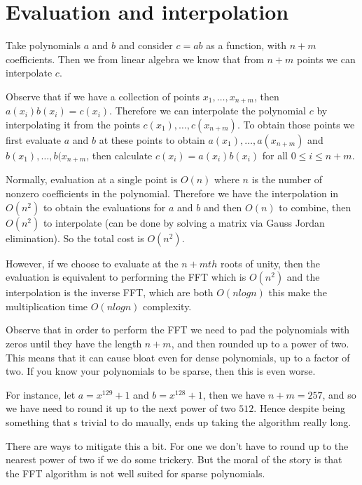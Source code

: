\chapter{Evaluation and interpolation}
\label{chapter1}

Take polynomials $a$ and $b$ and consider $c = ab$ as a function, with $n + m$ coefficients.
Then we from linear algebra we know that from $n + m$ points we can interpolate $c$.

Observe that if we have a collection of points $x_1, \ldots, x_{n+m}$, then $a(x_i)b(x_i) = c(x_i)$.
Therefore we can interpolate the polynomial $c$ by interpolating it from the points
$c(x_1), \ldots, c(x_{n+m})$. To obtain those points we first evaluate $a$ and $b$ at these points
to obtain $a(x_1), \ldots, a(x_{n+m})$ and $b(x_1), \ldots, b(x_{n+m}$, then calculate $c(x_i) = a(x_i)b(x_i)$ for all
$0 \leq i \leq n + m$.

Normally, evaluation at a single point is $O(n)$ where $n$ is the number of nonzero coefficients in the polynomial.
Therefore we have the interpolation in $O(n^2)$ to obtain the evaluations for $a$ and $b$ and then $O(n)$ to combine,
then $O(n^2)$ to interpolate (can be done by solving a matrix via Gauss Jordan elimination). So the total cost is $O(n^2)$.

However, if we choose to evaluate at the $n + mth$ roots of unity, then the evaluation is equivalent to performing the
FFT which is $O(n^2)$ and the interpolation is the inverse FFT, which are both $O(nlog n)$ this make the multiplication
time $O(n log n)$ complexity.

Observe that in order to perform the FFT we need to pad the polynomials with zeros until they have the length $n + m$, and then rounded up to a power of two. This means that it can cause bloat even for dense polynomials, up to a factor of two. If you know your polynomials to be sparse, then this is even worse. 

For instance, let $a = x^{129} + 1$ and $b = x^{128} + 1$, then we have $n + m = 257$, and so we have need to round it up to the next power of two $512$. Hence despite being something that s trivial to do maually, ends up taking the algorithm really long.

There are ways to mitigate this a bit. For one we don't have to round up to the nearest power of two if we do some trickery. But the moral of the story is that the FFT algorithm is not well suited for sparse polynomials.
